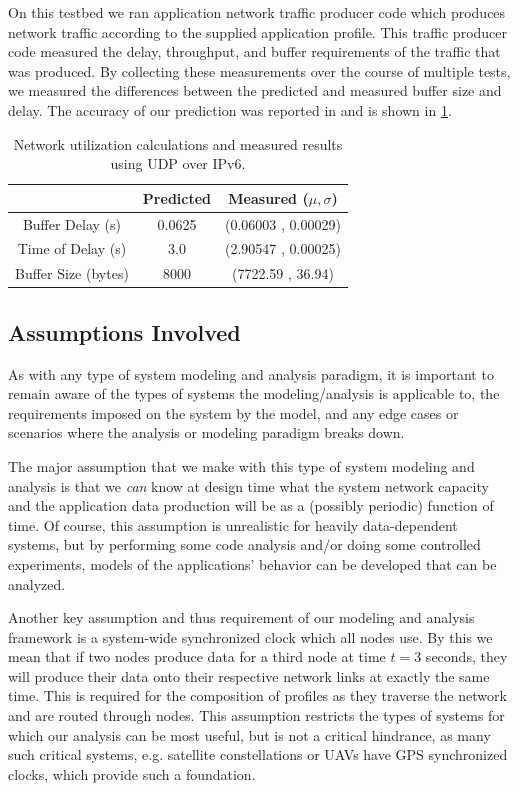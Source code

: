 On this testbed we ran application network traffic producer code which
produces network traffic according to the supplied application
profile.  This traffic producer code measured the delay, throughput,
and buffer requirements of the traffic that was produced.  By
collecting these measurements over the course of multiple tests, we
measured the differences between the predicted and measured buffer
size and delay.  The accuracy of our prediction was reported in
\cite{ISIS_F6_CYPHY:14} and is shown in \ref{table:results}.

\begin{table}[htbp]
\caption{Network utilization calculations and measured results using UDP over IPv6.}
\begin{tabular}{| c | c | c |}
\hline
 & Predicted & Measured ($\mu,\sigma$) \\\hline
Buffer Delay (s) & 0.0625 & (0.06003 , 0.00029) \\\hline
Time of Delay (s) & 3.0 & (2.90547 , 0.00025) \\\hline
Buffer Size (bytes) & 8000 & (7722.59 , 36.94) \\\hline
\end{tabular}
\label{table:results}
\end{table}

\subsection{Assumptions Involved}
\label{subsec:assumptions}

As with any type of system modeling and analysis paradigm, it is
important to remain aware of the types of systems the
modeling/analysis is applicable to, the requirements imposed on the
system by the model, and any edge cases or scenarios where the
analysis or modeling paradigm breaks down.

The major assumption that we make with this type of system modeling
and analysis is that we \emph{can} know at design time what the system
network capacity and the application data production will be as a
(possibly periodic) function of time.  Of course, this assumption is
unrealistic for heavily data-dependent systems, but by performing some
code analysis and/or doing some controlled experiments, models of the
applications' behavior can be developed that can be analyzed.

Another key assumption and thus requirement of our modeling and
analysis framework is a system-wide synchronized clock which all nodes
use.  By this we mean that if two nodes produce data for a third node
at time $t=3$ seconds, they will produce their data onto their
respective network links at exactly the same time.  This is required
for the composition of profiles as they traverse the network and are
routed through nodes.  This assumption restricts the types of systems
for which our analysis can be most useful, but is not a critical
hindrance, as many such critical systems, e.g. satellite
constellations or UAVs have GPS synchronized clocks, which provide
such a foundation.

